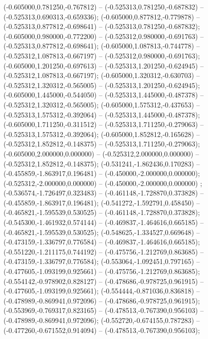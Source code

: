  (-0.605000,0.781250,-0.767812) -- (-0.525313,0.781250,-0.687832) -- (-0.525313,0.690313,-0.659336);
 (-0.605000,0.877812,-0.779878) -- (-0.525313,0.877812,-0.698641) -- (-0.525313,0.781250,-0.687832);
 (-0.605000,0.980000,-0.772200) -- (-0.525312,0.980000,-0.691763) -- (-0.525313,0.877812,-0.698641);
 (-0.605000,1.087813,-0.744778) -- (-0.525312,1.087813,-0.667197) -- (-0.525312,0.980000,-0.691763);
 (-0.605000,1.201250,-0.697613) -- (-0.525313,1.201250,-0.624945) -- (-0.525312,1.087813,-0.667197);
 (-0.605000,1.320312,-0.630703) -- (-0.525312,1.320312,-0.565005) -- (-0.525313,1.201250,-0.624945);
 (-0.605000,1.445000,-0.544050) -- (-0.525313,1.445000,-0.487378) -- (-0.525312,1.320312,-0.565005);
 (-0.605000,1.575312,-0.437653) -- (-0.525313,1.575312,-0.392064) -- (-0.525313,1.445000,-0.487378);
 (-0.605000,1.711250,-0.311512) -- (-0.525313,1.711250,-0.279063) -- (-0.525313,1.575312,-0.392064);
 (-0.605000,1.852812,-0.165628) -- (-0.525312,1.852812,-0.148375) -- (-0.525313,1.711250,-0.279063);
 (-0.605000,2.000000,0.000000) -- (-0.525312,2.000000,0.000000) -- (-0.525312,1.852812,-0.148375);
 (-0.531241,-1.862436,0.170283) -- (-0.455859,-1.863917,0.196481) -- (-0.450000,-2.000000,0.000000);
 (-0.525312,-2.000000,0.000000) -- (-0.450000,-2.000000,0.000000) ;
 (-0.536574,-1.726497,0.323483) -- (-0.461148,-1.728870,0.373828) -- (-0.455859,-1.863917,0.196481);
 (-0.541272,-1.592791,0.458450) -- (-0.465821,-1.595539,0.530525) -- (-0.461148,-1.728870,0.373828);
 (-0.545300,-1.461932,0.574144) -- (-0.469837,-1.464616,0.665185) -- (-0.465821,-1.595539,0.530525);
 (-0.548625,-1.334527,0.669648) -- (-0.473159,-1.336797,0.776584) -- (-0.469837,-1.464616,0.665185);
 (-0.551220,-1.211175,0.744192) -- (-0.475756,-1.212769,0.863685) -- (-0.473159,-1.336797,0.776584);
 (-0.553064,-1.092451,0.797165) -- (-0.477605,-1.093199,0.925661) -- (-0.475756,-1.212769,0.863685);
 (-0.554142,-0.978902,0.828127) -- (-0.478686,-0.978725,0.961915) -- (-0.477605,-1.093199,0.925661);
 (-0.554444,-0.871036,0.836818) -- (-0.478989,-0.869941,0.972096) -- (-0.478686,-0.978725,0.961915);
 (-0.553969,-0.769317,0.823165) -- (-0.478513,-0.767390,0.956103) -- (-0.478989,-0.869941,0.972096);
 (-0.552720,-0.674155,0.787283) -- (-0.477260,-0.671552,0.914094) -- (-0.478513,-0.767390,0.956103);
